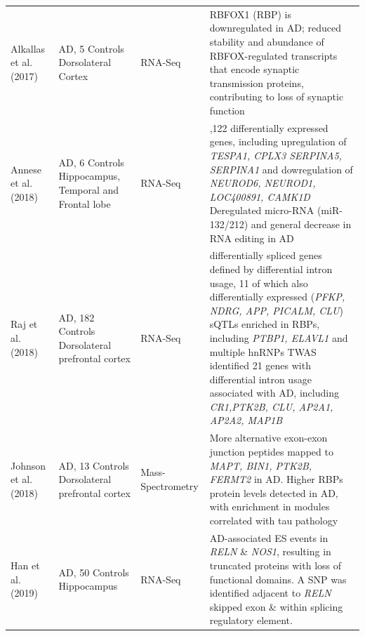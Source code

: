 \begin{landscape}
\begin{longtable}[c]{p{3cm}p{4cm}p{3cm}p{16cm}}
		\centering Alkallas et al. (2017)\cite{Alkallas2017} &
		\centering 6 AD, 5 Controls \newline Dorsolateral Cortex &
		\centering RNA-Seq &
		\tabitem RBFOX1 (RBP) is downregulated in AD; reduced stability and abundance of RBFOX-regulated transcripts that encode synaptic transmission proteins, contributing to loss of synaptic function	\\
		\hdashline[0.5pt/5pt]
		
		\centering Annese et al. (2018)\cite{Annese2018} &
		\centering 6 AD, 6 Controls \newline Hippocampus, Temporal and Frontal lobe &
		\centering RNA-Seq &
		\tabitem 2,122 differentially expressed genes, including upregulation of \textit{TESPA1, CPLX3 SERPINA5, SERPINA1} and dowregulation of \textit{NEUROD6, NEUROD1, LOC400891, CAMK1D} \newline
		\tabitem Deregulated micro-RNA (miR-132/212) and general decrease in RNA editing in AD \\
		\hdashline[0.5pt/5pt]
		
		\centering Raj et al. \newline (2018)\cite{Raj2018} &
		\centering 268 AD, 182 Controls \newline Dorsolateral prefrontal cortex &
		\centering RNA-Seq &
		\tabitem 84 differentially spliced genes defined by differential intron usage, 11 of which also differentially expressed (\textit{PFKP, NDRG, APP, PICALM, CLU}) \newline
		\tabitem sQTLs enriched in RBPs, including \textit{PTBP1, ELAVL1} and multiple hnRNPs \newline
		\tabitem TWAS identified 21 genes with differential intron usage associated with AD, including \textit{CR1,PTK2B, CLU, AP2A1, AP2A2, MAP1B} \\
		\hdashline[0.5pt/5pt]
		
		\centering Johnson et al. \newline (2018)\cite{Johnson2018} &
		\centering 20 AD, 13 Controls \newline Dorsolateral prefrontal cortex &
		\centering Mass-Spectrometry &
		\tabitem More alternative exon-exon junction peptides mapped to \textit{MAPT, BIN1, PTK2B, FERMT2} in AD. \newline 
		\tabitem Higher RBPs protein levels detected in AD, with enrichment in modules correlated with tau pathology \\
		\hdashline[0.5pt/5pt]	
		
		\centering Han et al. (2019) \cite{Han2019} &
		\centering 24 AD, 50 Controls \newline Hippocampus &
		\centering RNA-Seq &
		\tabitem 3 AD-associated ES events in \textit{RELN} \& \textit{NOS1}, resulting in truncated proteins with loss of functional domains. A SNP was identified adjacent to \textit{RELN} skipped exon \& within splicing regulatory element. \\
		

\end{longtable}
\end{landscape}
